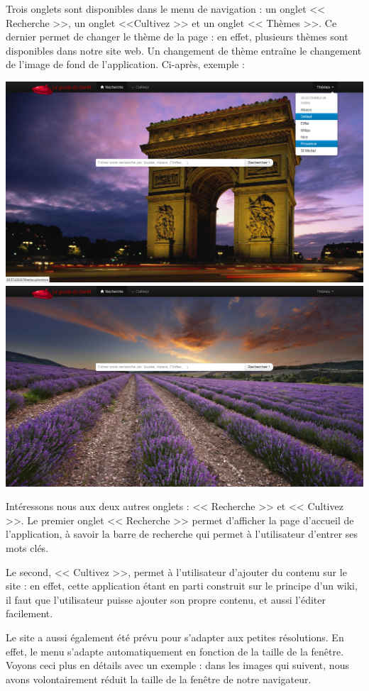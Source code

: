 \documentclass[12pt, a4paper]{article}
\newcommand{\espace}{\vspace{.8cm}}
\begin{document}
Trois onglets sont disponibles dans le menu de navigation : un onglet << Recherche >>, un onglet <<Cultivez >> et un onglet << Thèmes >>. Ce dernier permet de changer le thème de la page : en effet, plusieurs thèmes sont disponibles dans notre site web. Un changement de thème entraîne le changement de l'image de fond de l'application. Ci-après, exemple : 
\espace{}
\begin{center}
\includegraphics[width=.9\textwidth, keepaspectratio=true]{img/accueil3.png}
\espace{}
\includegraphics[width=.9\textwidth, keepaspectratio=true]{img/accueil2.png}
\end{center}

\espace{}
Intéressons nous aux deux autres onglets : << Recherche >> et << Cultivez >>.
Le premier onglet << Recherche >> permet d'afficher la page d'accueil de l'application, à savoir la barre de recherche qui permet à l'utilisateur d'entrer ses mots clés.

Le second, << Cultivez >>, permet à l'utilisateur d'ajouter du contenu sur le site : en effet, cette application étant en parti construit sur le principe d'un wiki, il faut que l'utilisateur puisse ajouter son propre contenu, et aussi l'éditer facilement.

Le site a aussi également été prévu pour s'adapter aux petites résolutions. En effet, le menu s'adapte automatiquement en fonction de la taille de la fenêtre. Voyons ceci plus en détails avec un exemple : dans les images qui suivent, nous avons volontairement réduit la taille de la fenêtre de notre navigateur.
\end{document}
